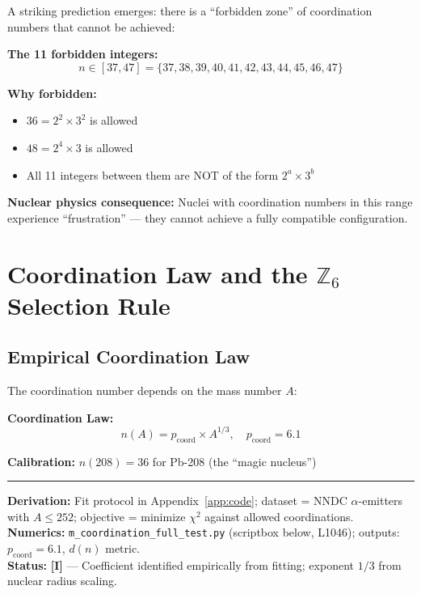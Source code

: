 \documentclass[11pt,a4paper]{article}
\newcommand{\tagI}{\textcolor{orange!80!black}{\textbf{[I]}}}
\begin{document}
A striking prediction emerges: there is a ``forbidden zone'' of coordination numbers that cannot be achieved:

\begin{warnbox}[title={\textbf{Forbidden Zone}}]
\textbf{The 11 forbidden integers:}
\begin{equation}
    n \in [37, 47] = \{37, 38, 39, 40, 41, 42, 43, 44, 45, 46, 47\}
\end{equation}

\textbf{Why forbidden:}
\begin{itemize}[nosep]
    \item $36 = 2^2 \times 3^2$ is allowed
    \item $48 = 2^4 \times 3$ is allowed
    \item All 11 integers between them are NOT of the form $2^a \times 3^b$
\end{itemize}

\textbf{Nuclear physics consequence:} Nuclei with coordination numbers in this range experience ``frustration'' --- they cannot achieve a fully compatible configuration.
\end{warnbox}

\section{Coordination Law and the $\mathbb{Z}_6$ Selection Rule}
\label{sec:coordination_law}

\subsection{Empirical Coordination Law}

The coordination number depends on the mass number $A$:

\begin{resultbox}
\textbf{Coordination Law:}
\begin{equation}
    n(A) = p_{\mathrm{coord}} \times A^{1/3}, \quad p_{\mathrm{coord}} = 6.1
    \label{eq:coordination_law}
\end{equation}

\textbf{Calibration:} $n(208) = 36$ for Pb-208 (the ``magic nucleus'')

\vspace{0.3em}\hrule\vspace{0.3em}
\textbf{Derivation:} Fit protocol in Appendix~\ref{app:code}; dataset = NNDC $\alpha$-emitters with $A \leq 252$; objective = minimize $\chi^2$ against allowed coordinations.\\
\textbf{Numerics:} \texttt{m\_coordination\_full\_test.py} (scriptbox below, L1046); outputs: $p_{\mathrm{coord}} = 6.1$, $d(n)$ metric.\\
\textbf{Status:} \tagI{} --- Coefficient identified empirically from fitting; exponent $1/3$ from nuclear radius scaling.
\end{resultbox}
\end{document}
